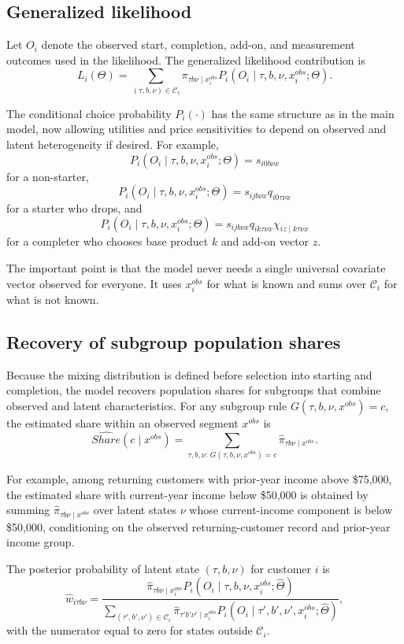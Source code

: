\documentclass[11pt]{article}
\begin{document}
\subsection{Generalized likelihood}

Let $O_i$ denote the observed start, completion, add-on, and measurement outcomes used in the likelihood. The generalized likelihood contribution is
\[
L_i(\Theta)
=
\sum_{(\tau,b,\nu)\in\mathcal C_i}
\pi_{\tau b\nu\mid x_i^{obs}}
P_i(O_i\mid \tau,b,\nu,x_i^{obs};\Theta).
\]

The conditional choice probability $P_i(\cdot)$ has the same structure as in the main model, now allowing utilities and price sensitivities to depend on observed and latent heterogeneity if desired. For example,
\[
P_i(O_i\mid \tau,b,\nu,x_i^{obs};\Theta)=s_{i0b\nu x}
\]
for a non-starter,
\[
P_i(O_i\mid \tau,b,\nu,x_i^{obs};\Theta)
=s_{ijb\nu x}q_{i0\tau\nu x}
\]
for a starter who drops, and
\[
P_i(O_i\mid \tau,b,\nu,x_i^{obs};\Theta)
=s_{ijb\nu x}q_{ik\tau\nu x}\chi_{iz\mid k\tau\nu x}
\]
for a completer who chooses base product $k$ and add-on vector $z$.

The important point is that the model never needs a single universal covariate vector observed for everyone. It uses $x_i^{obs}$ for what is known and sums over $\mathcal C_i$ for what is not known.

\subsection{Recovery of subgroup population shares}

Because the mixing distribution is defined before selection into starting and completion, the model recovers population shares for subgroups that combine observed and latent characteristics. For any subgroup rule $G(\tau,b,\nu,x^{obs})=c$, the estimated share within an observed segment $x^{obs}$ is
\[
\widehat{Share}(c\mid x^{obs})
=
\sum_{\tau,b,\nu:\,G(\tau,b,\nu,x^{obs})=c}
\widehat\pi_{\tau b\nu\mid x^{obs}}.
\]

For example, among returning customers with prior-year income above \$75,000, the estimated share with current-year income below \$50,000 is obtained by summing $\widehat\pi_{\tau b\nu\mid x^{obs}}$ over latent states $\nu$ whose current-income component is below \$50,000, conditioning on the observed returning-customer record and prior-year income group.

The posterior probability of latent state $(\tau,b,\nu)$ for customer $i$ is
\[
\widehat w_{i\tau b\nu}
=
\frac{
\widehat\pi_{\tau b\nu\mid x_i^{obs}}
P_i(O_i\mid \tau,b,\nu,x_i^{obs};\widehat\Theta)
}{
\sum_{(\tau',b',\nu')\in\mathcal C_i}
\widehat\pi_{\tau'b'\nu'\mid x_i^{obs}}
P_i(O_i\mid \tau',b',\nu',x_i^{obs};\widehat\Theta)
},
\]
with the numerator equal to zero for states outside $\mathcal C_i$.
\end{document}
